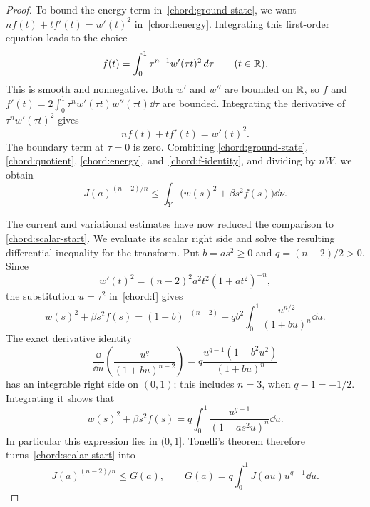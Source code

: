 \begin{proof}
To bound the energy term in~\eqref{chord:ground-state}, we want
$nf(t)+tf'(t)=w'(t)^2$ in~\eqref{chord:energy}. Integrating this
first-order equation leads to the choice
\begin{equation}\label{chord:f}
 f(t)=\int_0^1\tau^{n-1}w'(\tau t)^2\,d\tau
                   \qquad(t\in\mathbb R).
\end{equation}
This is smooth and nonnegative. Both $w'$ and $w''$ are bounded
on $\mathbb R$, so $f$ and
$f'(t)=2\int_0^1\tau^nw'(\tau t)w''(\tau t)\dd\tau$
are bounded. Integrating the derivative of
$\tau^nw'(\tau t)^2$ gives
\begin{equation}\label{chord:f-identity}
 nf(t)+tf'(t)=w'(t)^2.
\end{equation}
The boundary term at $\tau=0$ is zero. Combining
\eqref{chord:ground-state}, \eqref{chord:quotient},
\eqref{chord:energy}, and~\eqref{chord:f-identity}, and dividing
by $nW$, we obtain
\begin{equation}\label{chord:scalar-start}
 J(a)^{(n-2)/n}
          \le\int_Y\bigl(w(s)^2+\beta s^2f(s)\bigr)\dd\nu.
\end{equation}

The current and variational estimates have now reduced the comparison
to \eqref{chord:scalar-start}. We evaluate its scalar right side and
solve the resulting differential inequality for the transform. Put
$b=as^2\ge0$ and $q=(n-2)/2>0$. Since
\[
 w'(t)^2=(n-2)^2a^2t^2(1+at^2)^{-n},
\]
the substitution $u=\tau^2$ in~\eqref{chord:f} gives
\[
 w(s)^2+\beta s^2f(s)
 =(1+b)^{-(n-2)}
             +q b^2\int_0^1\frac{u^{n/2}}{(1+bu)^n}\dd u.
\]
The exact derivative identity
\[
 \frac{\dd}{\dd u}\left(\frac{u^q}{(1+bu)^{n-2}}\right)
       =q\frac{u^{q-1}(1-b^2u^2)}{(1+bu)^n}
\]
has an integrable right side on $(0,1)$; this includes $n=3$,
when $q-1=-1/2$. Integrating it shows that
\begin{equation}\label{chord:scalar-identity}
 w(s)^2+\beta s^2f(s)
       =q\int_0^1\frac{u^{q-1}}{(1+as^2u)^n}\dd u.
\end{equation}
In particular this expression lies in $(0,1]$. Tonelli's theorem
therefore turns~\eqref{chord:scalar-start} into
\begin{equation}\label{chord:J-G}
 J(a)^{(n-2)/n}\le G(a),\qquad
 G(a)=q\int_0^1J(au)u^{q-1}\dd u.
\end{equation}


\end{proof}

